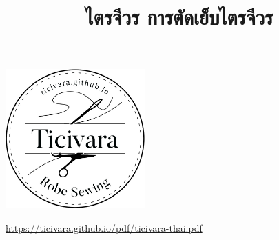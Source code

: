 \documentclass[10pt, twoside, final]{memoir}
\title{ไตรจีวร การตัดเย็บไตรจีวร}
\begin{document}
\frontmatter

\thispagestyle{empty}
{\centering

  \vspace*{15mm}

  {\chapterTitleFont\fontsize{22}{22}\selectfont\thetitle}

  \vspace*{10mm}

  \includegraphics[width=0.4\textwidth]{./images/logo.jpg}

  \vspace*{10mm}

}


{\centering%
  \begin{minipage}{0.7\textwidth}%
    \tableofcontents*%
  \end{minipage}%
  \par}

\vfill

{%
  \centering\firaSansFont\small\selectfont
  \href{https://ticivara.github.io/pdf/ticivara-thai.pdf}{https://ticivara.github.io/pdf/ticivara-thai.pdf}%
  \par}

\mainmatter


{\raggedright








}
\end{document}
